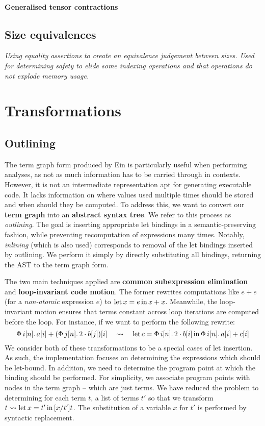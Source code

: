 \paragraph{Generalised tensor contractions}

\todothis

\subsection{Size equivalences}

\textit{Using equality assertions to create an equivalence judgement between sizes. Used for determining safety to elide some indexing operations and that operations do not explode memory usage.} \todothis 


\section{Transformations}
\label{compiler-transformations}

\subsection{Outlining}

The term graph form produced by Ein is particularly useful when performing analyses, as not as much information has to be carried through in contexts. However, it is not an intermediate representation apt for generating executable code. It lacks information on where values used multiple times should be stored and when should they be computed. To address this, we want to convert our \textbf{term graph} into an \textbf{abstract syntax tree}. We refer to this process as \textit{outlining}. The goal is inserting appropriate let bindings in a semantic-preserving fashion, while preventing recomputation of expressions many times. Notably, \textit{inlining} (which is also used) corresponds to removal of the let bindings inserted by outlining. We perform it simply by directly substituting all bindings, returning the AST to the term graph form.

The two main techniques applied are \textbf{common subexpression elimination} and \textbf{loop-invariant code motion}. The former rewrites computations like $e + e$ (for a \textit{non-atomic} expression $e$) to  $\mathrm{let}\,{x}={e}\,\mathrm{in}\,{x + x}$. Meanwhile, the loop-invariant motion ensures that terms constant across loop iterations are computed before the loop. For instance, if we want to perform the following rewrite:
$$ 
\phivec{i}{n}{a[i] + \left( \phivec{j}{n}{2 \cdot b[j]} \right)[i]} \quad\leadsto\quad \philet{c}{\phivec{i}{n}{2 \cdot b[i]}}{\phivec{i}{n}{a[i] + c[i]}} 
$$
We consider both of these transformations to be a special cases of let insertion. As such, the implementation focuses on determining the expressions which should be let-bound. In addition, we need to determine the program point at which the binding should be performed. For simplicity, we associate program points with nodes in the term graph -- which are just terms. We have reduced the problem to determining for each term $t$, a list of terms $t'$ so that we transform $t \leadsto \mathrm{let}\,{x}={t'}\,\mathrm{in}\,{[x/t']t}$. The substitution of a variable $x$ for $t'$ is performed by syntactic replacement.

